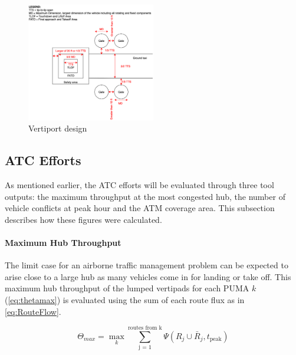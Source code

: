\begin{figure}[H]
    \centering
    \includegraphics[width=0.5\textwidth]{Figures/Vertiport_design.png}
    \captionsetup{justification=centering}
    \caption{Vertiport design}
    \label{fig:vertiport}
\end{figure}

\subsection{ATC Efforts}
As mentioned earlier, the ATC efforts will be evaluated through three tool outputs: the maximum throughput at the most congested hub, the number of vehicle conflicts at peak hour and the ATM coverage area. This subsection describes how these figures were calculated. %

\paragraph{Maximum Hub Throughput}

The limit case for an airborne traffic management problem can be expected to arise close to a large hub as many vehicles come in for landing or take off. This maximum hub throughput of the lumped vertipads for each PUMA $k$ (\autoref{eq:thetamax}) is evaluated using the sum of each route flux as in \autoref{eq:RouteFlow}.

\begin{equation}
\label{eq:thetamax}
    \Theta_{max} = \max_k \sum_{ \text{j = 1} }^{ \text{routes from k} } { \Psi(R_j \cup\bar{R}_j, t_{\text{peak}}) }
\end{equation}



